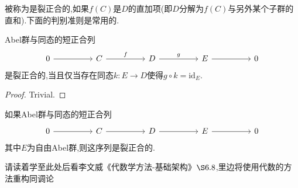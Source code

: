 \documentclass{article}
\begin{document}
被称为是裂正合的,如果$f(C)$是$D$的直加项(即$D$分解为$f(C)$与另外某个子群的直和).下面的判别准则是常用的.
\begin{proposition}
    Abel群与同态的短正合列
    \[\begin{tikzcd}
        0 && C && D && E && 0
        \arrow["f", from=1-3, to=1-5]
        \arrow["g", from=1-5, to=1-7]
        \arrow[from=1-1, to=1-3]
        \arrow[from=1-7, to=1-9]
    \end{tikzcd}\]
    是裂正合的,当且仅当存在同态$k : E \to D$使得$g \circ k  = \text{id}_E$.
\end{proposition}
\begin{proof}
Trivial.
\end{proof}
\begin{corollary}
    如果Abel群与同态的短正合列
    \[\begin{tikzcd}
        0 && C && D && E && 0
        \arrow[from=1-1, to=1-3]
        \arrow[from=1-3, to=1-5]
        \arrow[from=1-5, to=1-7]
        \arrow[from=1-7, to=1-9]
    \end{tikzcd}\]
    其中$E$为自由Abel群,则这序列是裂正合的.
\end{corollary}
\begin{remark}
    请读着学至此处后看李文威《代数学方法-基础架构》$\S6.8$,里边将使用代数的方法重构同调论
\end{remark}
\end{document}
